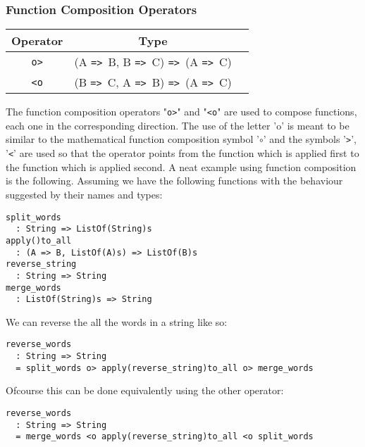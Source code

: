 \documentclass{article}
\def\ra{\texttt{=>}\ }
\begin{document}
\subsubsection{Function Composition Operators}
\begin{center}
\begin{tabular}{ |c|c|c| } 
\hline
Operator & Type \\ 
\hline
\hline
\texttt{o>} & (A \ra B, B \ra C) \ra (A \ra C) \\
\hline
\texttt{<o} & (B \ra C, A \ra B) \ra (A \ra C) \\
\hline
\end{tabular}
\end{center}
The function composition operators "\texttt{o>}" and "\texttt{<o}" are used to 
compose functions, each one in the corresponding direction. The use of the letter 'o'
is meant to be similar to the mathematical function composition symbol '\(\circ\)'
and the symbols '\texttt{>}', '\texttt{<}' are used so that the operator points from
the function which is applied first to the function which is applied second.
A neat example using function composition is the following. Assuming we have the
following functions with the behaviour suggested by their names and types: 
\begin{verbatim}
split_words
  : String => ListOf(String)s
apply()to_all
  : (A => B, ListOf(A)s) => ListOf(B)s
reverse_string
  : String => String
merge_words
  : ListOf(String)s => String
\end{verbatim}
We can reverse the all the words in a string like so:
\begin{verbatim}
reverse_words
  : String => String
  = split_words o> apply(reverse_string)to_all o> merge_words
\end{verbatim}
Ofcourse this can be done equivalently using the other operator:
\begin{verbatim}
reverse_words
  : String => String
  = merge_words <o apply(reverse_string)to_all <o split_words
\end{verbatim}
\end{document}
